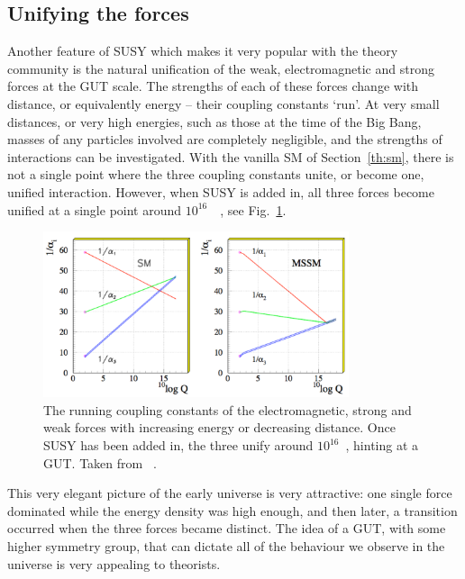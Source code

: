 \subsection{Unifying the forces}

Another feature of \ac{SUSY} which makes it very popular with the theory community 
is the natural unification of the weak, electromagnetic and strong forces at the \ac{GUT} scale.
The strengths of each of these forces change with distance, or equivalently energy -- their coupling constants `run'. 
At very small distances, or very high energies, such as those at the time of the Big Bang, masses of any particles involved are completely negligible, and the strengths of interactions can be investigated.
With the vanilla \ac{SM} of Section~\ref{th:sm}, there is not a single point where the three coupling constants unite, or become one, unified interaction. 
However, when \ac{SUSY} is added in, all three forces become unified at a single point around $10^{16}$~\GeV~\cite{GUT}, see Fig.~\ref{fig:SUSgut}.

\begin{figure}[htbp]
  \begin{center}
  \includegraphics[width=0.8\textwidth]{Figures/theory/GUTunification}
  \caption{The running coupling constants of the electromagnetic, strong and weak forces with increasing energy or decreasing distance. Once \ac{SUSY} has been added in, the three unify around $10^{16}$~\GeV, hinting at a \ac{GUT}. Taken from ~\cite{GUTpic}.}
  \label{fig:SUSgut}
  \end{center}
\end{figure}

This very elegant picture of the early universe is very attractive: one single force dominated while the energy density was high enough, and then later, a transition occurred when the three forces became distinct.
The idea of a \ac{GUT}, with some higher symmetry group, that can dictate all of the behaviour we observe in the universe is very appealing to theorists.


